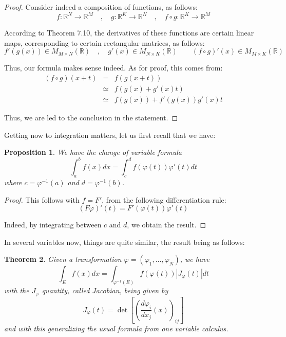 \documentclass[12pt]{amsbook}
\newtheorem{theorem}{Theorem}[chapter]
\newtheorem{proposition}[theorem]{Proposition}
\begin{document}
\begin{proof}
Consider indeed a composition of functions, as follows:
$$f:\mathbb R^N\to\mathbb R^M\quad,\quad 
g:\mathbb R^K\to\mathbb R^N\quad,\quad 
f\circ g:\mathbb R^K\to\mathbb R^M$$

According to Theorem 7.10, the derivatives of these functions are certain linear maps, corresponding to certain rectangular matrices, as follows:
$$f'(g(x))\in M_{M\times N}(\mathbb R)\quad,\quad 
g'(x)\in M_{N\times K}(\mathbb R)\quad\quad
(f\circ g)'(x)\in M_{M\times K}(\mathbb R)$$

Thus, our formula makes sense indeed. As for proof, this comes from:
\begin{eqnarray*}
(f\circ g)(x+t)
&=&f(g(x+t))\\
&\simeq&f(g(x)+g'(x)t)\\
&\simeq&f(g(x))+f'(g(x))g'(x)t
\end{eqnarray*}

Thus, we are led to the conclusion in the statement.
\end{proof}

Getting now to integration matters, let us first recall that we have:

\begin{proposition}
We have the change of variable formula
$$\int_a^bf(x)dx=\int_c^df(\varphi(t))\varphi'(t)dt$$
where $c=\varphi^{-1}(a)$ and $d=\varphi^{-1}(b)$.
\end{proposition}

\begin{proof}
This follows with $f=F'$, from the following differentiation rule:
$$(F\varphi)'(t)=F'(\varphi(t))\varphi'(t)$$

Indeed, by integrating between $c$ and $d$, we obtain the result.
\end{proof}

In several variables now, things are quite similar, the result being as follows:


\begin{theorem}
Given a transformation $\varphi=(\varphi_1,\ldots,\varphi_N)$, we have
$$\int_Ef(x)dx=\int_{\varphi^{-1}(E)}f(\varphi(t))|J_\varphi(t)|dt$$
with the $J_\varphi$ quantity, called Jacobian, being given by
$$J_\varphi(t)=\det\left[\left(\frac{d\varphi_i}{dx_j}(x)\right)_{ij}\right]$$ 
and with this generalizing the usual formula from one variable calculus.
\end{theorem}
\end{document}
